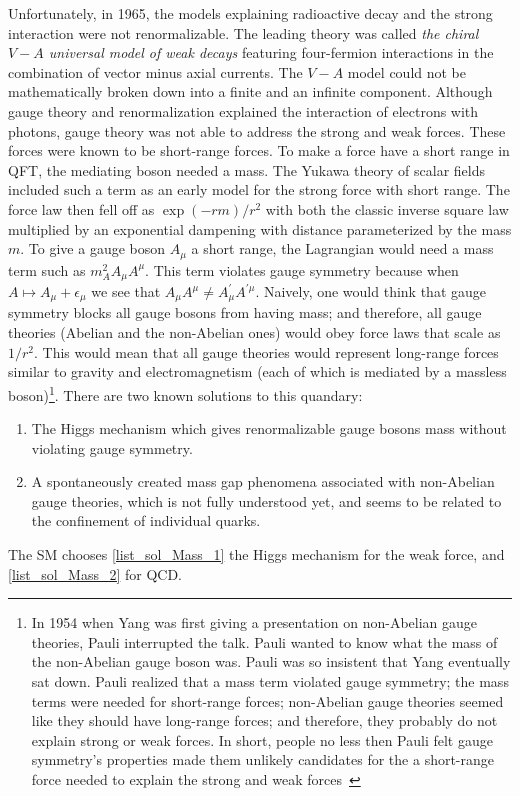Unfortunately, in 1965, the models explaining radioactive decay and the strong interaction were not renormalizable. The leading theory was called \textit{the chiral $V-A$ universal model of weak decays} featuring four-fermion interactions in the combination of vector minus axial currents. The $V-A$ model could not be mathematically broken down into a finite and an infinite component. Although gauge theory and renormalization explained the interaction of electrons with photons, gauge theory was not able to address the strong and weak forces. These forces were known to be short-range forces. To make a force have a short range in QFT, the mediating boson needed a mass. The Yukawa theory of scalar fields included such a term as an early model for the strong force with short range. The force law then fell off as $\exp (-r m) / r^{2}$ with both the classic inverse square law multiplied by an exponential dampening with distance parameterized by the mass $m$. To give a gauge boson $A_{\mu}$ a short range, the Lagrangian would need a mass term such as $m_{A}^{2} A_{\mu} A^{\mu}$. This term violates gauge symmetry because when $A\mapsto A_{\mu}+\epsilon_\mu$ we see that $A_{\mu} A^{\mu} \neq A_{\mu}^{\prime} A^{\prime \mu}$. Naively, one would think that gauge symmetry blocks all gauge bosons from having mass; and therefore, all gauge theories (Abelian and the non-Abelian ones) would obey force laws that scale as $1 / r^{2}$. This would mean that all gauge theories would represent long-range forces similar to gravity and electromagnetism (each of which is mediated by a massless boson)\footnote{In 1954 when Yang was first giving a presentation on non-Abelian gauge theories, Pauli interrupted the talk. Pauli wanted to know what the mass of the non-Abelian gauge boson was. Pauli was so insistent that Yang eventually sat down. Pauli realized that a mass term violated gauge symmetry; the mass terms were needed for short-range forces; non-Abelian gauge theories seemed like they should have long-range forces; and therefore, they probably do not explain strong or weak forces. In short, people no less then Pauli felt gauge symmetry's properties made them unlikely candidates for the a short-range force needed to explain the strong and weak forces~\parencite{robinson2011symmetry}}. There are two known solutions to this quandary: 
\begin{enumerate}
	\item \label{list_sol_Mass_1}The Higgs mechanism which gives renormalizable gauge bosons mass without violating gauge symmetry.
	\item \label{list_sol_Mass_2}A spontaneously created mass gap phenomena associated with non-Abelian gauge theories, which is not fully understood yet, and seems to be related to the confinement of individual quarks.
\end{enumerate}
The SM chooses \eqref{list_sol_Mass_1} the Higgs mechanism for the weak force, and \eqref{list_sol_Mass_2} for QCD.

